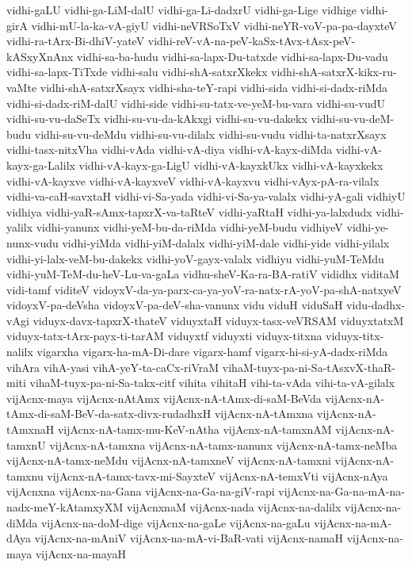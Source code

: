 {vidhi-gaLU
vidhi-ga-LiM-dalU
vidhi-ga-Li-dadxrU
vidhi-ga-Lige
vidhige
vidhi-girA
vidhi-mU-la-ka-vA-giyU
vidhi-neVRSoTxV
vidhi-neYR-voV-pa-pa-dayxteV
vidhi-ra-tArx-Bi-dhiV-yateV
vidhi-reV-vA-na-peV-kaSx-tAvx-tAsx-peV-kASxyXnAnx
vidhi-sa-ba-hudu
vidhi-sa-lapx-Du-tatxde
vidhi-sa-lapx-Du-vadu
vidhi-sa-lapx-TiTxde
vidhi-salu
vidhi-shA-satxrXkekx
vidhi-shA-satxrX-kikx-ru-vaMte
vidhi-shA-satxrXsayx
vidhi-sha-teY-rapi
vidhi-sida
vidhi-si-dadx-riMda
vidhi-si-dadx-riM-dalU
vidhi-side
vidhi-su-tatx-ve-yeM-bu-vara
vidhi-su-vudU
vidhi-su-vu-daSeTx
vidhi-su-vu-da-kAkxgi
vidhi-su-vu-dakekx
vidhi-su-vu-deM-budu
vidhi-su-vu-deMdu
vidhi-su-vu-dilalx
vidhi-su-vudu
vidhi-ta-natxrXsayx
vidhi-tasx-nitxVha
vidhi-vAda
vidhi-vA-diya
vidhi-vA-kayx-diMda
vidhi-vA-kayx-ga-Lalilx
vidhi-vA-kayx-ga-LigU
vidhi-vA-kayxkUkx
vidhi-vA-kayxkekx
vidhi-vA-kayxve
vidhi-vA-kayxveV
vidhi-vA-kayxvu
vidhi-vAyx-pA-ra-vilalx
vidhi-va-caH-savxtaH
vidhi-vi-Sa-yada
vidhi-vi-Sa-ya-valalx
vidhi-yA-gali
vidhiyU
vidhiya
vidhi-yaR-sAmx-tapxrX-va-taRteV
vidhi-yaRtaH
vidhi-ya-lalxdudx
vidhi-yalilx
vidhi-yanunx
vidhi-yeM-bu-da-riMda
vidhi-yeM-budu
vidhiyeV
vidhi-ye-nunx-vudu
vidhi-yiMda
vidhi-yiM-dalalx
vidhi-yiM-dale
vidhi-yide
vidhi-yilalx
vidhi-yi-lalx-veM-bu-dakekx
vidhi-yoV-gayx-valalx
vidhiyu
vidhi-yuM-TeMdu
vidhi-yuM-TeM-du-heV-Lu-va-gaLa
vidhu-sheV-Ka-ra-BA-ratiV
vididhx
viditaM
vidi-tamf
viditeV
vidoyxV-da-ya-parx-ca-ya-yoV-ra-natx-rA-yoV-pa-shA-natxyeV
vidoyxV-pa-deVsha
vidoyxV-pa-deV-sha-vanunx
vidu
viduH
viduSaH
vidu-dadhx-vAgi
viduyx-davx-tapxrX-thateV
viduyxtaH
viduyx-tasx-veVRSAM
viduyxtatxM
viduyx-tatx-tArx-payx-ti-tarAM
viduyxtf
viduyxti
viduyx-titxna
viduyx-titx-nalilx
vigarxha
vigarx-ha-mA-Di-dare
vigarx-hamf
vigarx-hi-si-yA-dadx-riMda
vihAra
vihA-yasi
vihA-yeY-ta-caCx-riVraM
vihaM-tuyx-pa-ni-Sa-tAsxvX-thaR-miti
vihaM-tuyx-pa-ni-Sa-takx-citf
vihita
vihitaH
vihi-ta-vAda
vihi-ta-vA-gilalx
vijAcnx-maya
vijAcnx-nAtAmx
vijAcnx-nA-tAmx-di-saM-BeVda
vijAcnx-nA-tAmx-di-saM-BeV-da-satx-divx-rudadhxH
vijAcnx-nA-tAmxna
vijAcnx-nA-tAmxnaH
vijAcnx-nA-tamx-mu-KeV-nAtha
vijAcnx-nA-tamxnAM
vijAcnx-nA-tamxnU
vijAcnx-nA-tamxna
vijAcnx-nA-tamx-nanunx
vijAcnx-nA-tamx-neMba
vijAcnx-nA-tamx-neMdu
vijAcnx-nA-tamxneV
vijAcnx-nA-tamxni
vijAcnx-nA-tamxnu
vijAcnx-nA-tamx-tavx-mi-SayxteV
vijAcnx-nA-temxVti
vijAcnx-nAya
vijAcnxna
vijAcnx-na-Gana
vijAcnx-na-Ga-na-giV-rapi
vijAcnx-na-Ga-na-mA-na-nadx-meY-kAtamxyXM
vijAcnxnaM
vijAcnx-nada
vijAcnx-na-dalilx
vijAcnx-na-diMda
vijAcnx-na-doM-dige
vijAcnx-na-gaLe
vijAcnx-na-gaLu
vijAcnx-na-mA-dAya
vijAcnx-na-mAniV
vijAcnx-na-mA-vi-BaR-vati
vijAcnx-namaH
vijAcnx-na-maya
vijAcnx-na-mayaH
}
